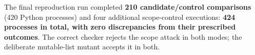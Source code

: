 The final reproduction run completed \textbf{210 candidate/control comparisons} (420 Python processes) and four additional scope-control executions: \textbf{424 processes in total, with zero discrepancies from their prescribed outcomes}. The correct checker rejects the scope attack in both modes; the deliberate mutable-list mutant accepts it in both.
